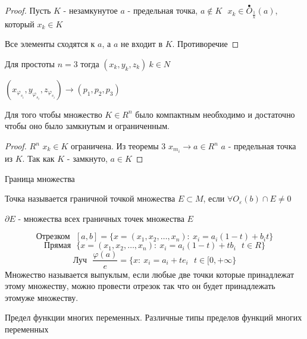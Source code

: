 \begin{proof}
  Пусть $K$ - незамкунутое $a$ - предельная точка, $a \not\in K ~~~
  x_k \in \stackrel{\bullet}{O}_{\frac{1}{k}}(a)$, который $x_k \in K$

  Все элементы сходятся к $a$, а $a$ не входит в $K$. Противоречие
\end{proof}

\begin{theorem}
  Для простоты $n = 3$ тогда $(x_k, y_k, z_k) ~ k \in N$

  $(x_{\varphi_{s_i}}, y_{\varphi_{s_i}}, z_{\varphi_{s_i}}) \to
  (p_1, p_2, p_3)$
\end{theorem}

\begin{theorem}
  Для того чтобы множество $K \in R^n$ было компактным необходимо и достаточно
  чтобы оно было замкнутым и ограниченным.
\end{theorem}

\begin{proof}
  $R^n$ $x_k \in K$ ограничена. Из теоремы 3 $x_{m_i} \to a \in R^n$ $a$ -
  предельная точка из $K$. Так как $K$ - замкнуто, $a \in K$
\end{proof}

\begin{title}[\Large]
  Граница множества
\end{title}

\begin{define}
  Точка называется граничной точкой множества $E \subset M$, если
  $\forall O_{\varepsilon}(b)\cap E \not= 0$

  $\partial E$ - множества всех граничных точек множества $E$
\end{define}

\begin{define}
  $$
  \text{Отрезком} ~~~ [a,b] = \{ x = (x_1, x_2, \ldots, x_n): ~
  x_i = a_i(1 - t) + b_it \}
  $$
  $$
  \text{Прямая} ~~~ \{ x = (x_1, x_2, \ldots, x_n): ~ x_i = a_i(1 - t) +
  tb_i ~~~ t \in R \}
  $$
  $$
  \text{Луч} ~~~ \frac{\varphi(a)}{e} = \{ x: ~ x_i = a_i + te_i ~~~
  t \in [0, + \infty\}
  $$
  Множество называется выпуклым, если любые две точки которые принадлежат этому
  множеству, можно провести отрезок так что он будет принадлежать этомуже
  множеству.
\end{define}

\begin{title}[\Large]
  Предел функции многих переменных. Различные типы пределов функций многих
  переменных
\end{title}

